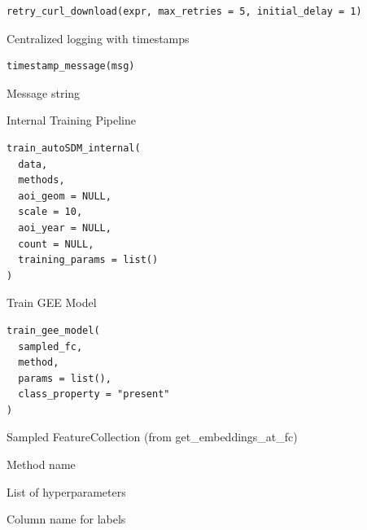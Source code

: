 \documentclass[letterpaper]{book}
\begin{document}
%
\begin{Usage}
\begin{verbatim}
retry_curl_download(expr, max_retries = 5, initial_delay = 1)
\end{verbatim}
\end{Usage}
%
\begin{Description}
Centralized logging with timestamps
\end{Description}
%
\begin{Usage}
\begin{verbatim}
timestamp_message(msg)
\end{verbatim}
\end{Usage}
%
\begin{Arguments}
\begin{ldescription}
\item[\code{msg}] Message string
\end{ldescription}
\end{Arguments}
%
\begin{Description}
Internal Training Pipeline
\end{Description}
%
\begin{Usage}
\begin{verbatim}
train_autoSDM_internal(
  data,
  methods,
  aoi_geom = NULL,
  scale = 10,
  aoi_year = NULL,
  count = NULL,
  training_params = list()
)
\end{verbatim}
\end{Usage}
%
\begin{Description}
Train GEE Model
\end{Description}
%
\begin{Usage}
\begin{verbatim}
train_gee_model(
  sampled_fc,
  method,
  params = list(),
  class_property = "present"
)
\end{verbatim}
\end{Usage}
%
\begin{Arguments}
\begin{ldescription}
\item[\code{sampled\_fc}] Sampled FeatureCollection (from get\_embeddings\_at\_fc)

\item[\code{method}] Method name

\item[\code{params}] List of hyperparameters

\item[\code{class\_property}] Column name for labels
\end{ldescription}
\end{Arguments}
\end{document}

